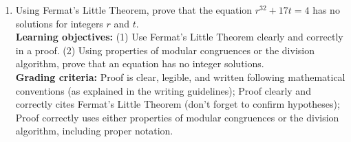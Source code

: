 \documentclass[12pt]{article}
\begin{document}
\begin{enumerate}
\item Using Fermat's Little Theorem, prove that the equation $r^{32}+17t=4$ has no solutions for integers $r$ and $t$. \\
{\bf Learning objectives:} (1) Use Fermat's Little Theorem clearly and correctly in a proof.  (2) Using properties of modular congruences or the division algorithm, prove that an equation has no integer solutions. \\
{\bf Grading criteria:} Proof is clear, legible, and written following mathematical conventions (as explained in the writing guidelines); Proof clearly and correctly cites Fermat's Little Theorem (don't forget to confirm hypotheses); Proof correctly uses either properties of modular congruences or the division algorithm, including proper notation.

\end{enumerate}
\end{document}
